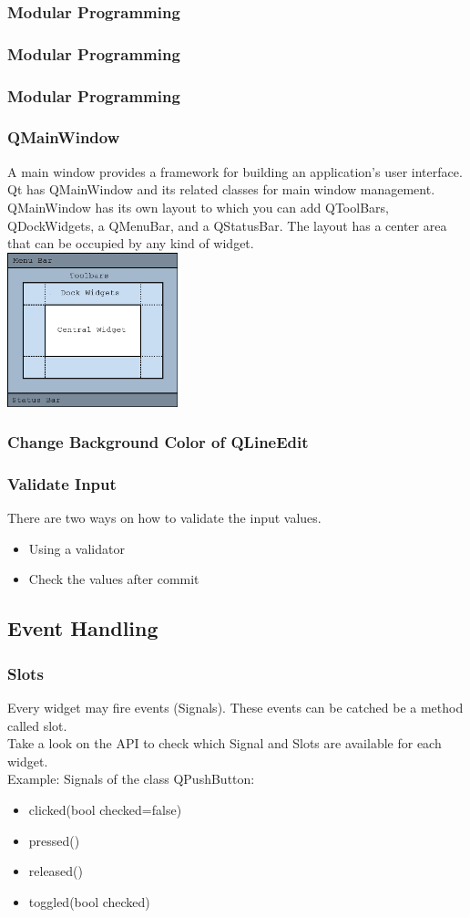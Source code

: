 \begin{frame}[fragile]
\frametitle{Modular Programming}
{\tiny

}
\end{frame}

\begin{frame}[fragile]
\frametitle{Modular Programming}
{\tiny

}
\end{frame}

\begin{frame}[fragile]
	\frametitle{Modular Programming}
	{\tiny
	
	}
\end{frame}

\frame
{
	\frametitle{QMainWindow}
	A main window provides a framework for building an application's user interface.
	Qt has QMainWindow and its related classes for main window management.
	QMainWindow has its own layout to which you can add QToolBars, QDockWidgets,
	a QMenuBar, and a QStatusBar. The layout has a center area that can be occupied
	by any kind of widget.\\
	\includegraphics[width=140pt]{img/mainwindowlayout.png}

}

\frame
{
	\frametitle{Change Background Color of QLineEdit}
	
}

\frame
{
	\frametitle{Validate Input}
	There are two ways on how to validate the input values.
	\begin{itemize}
	\item Using a validator
	{\tiny
	
	}
	\item Check the values after commit
	{\tiny
	
	}
	\end{itemize}
}


\subsection{Event Handling}
\frame
{
	\frametitle{Slots}
	Every widget may fire events (Signals). These events can be catched be a method
	called slot.\\
	Take a look on the API to check which Signal and Slots are available for each
	widget.\\
	Example: Signals of the class QPushButton:
	\begin{itemize}
	\item clicked(bool checked=false)
	\item pressed()
	\item released()
	\item toggled(bool checked)
	\end{itemize}
}

